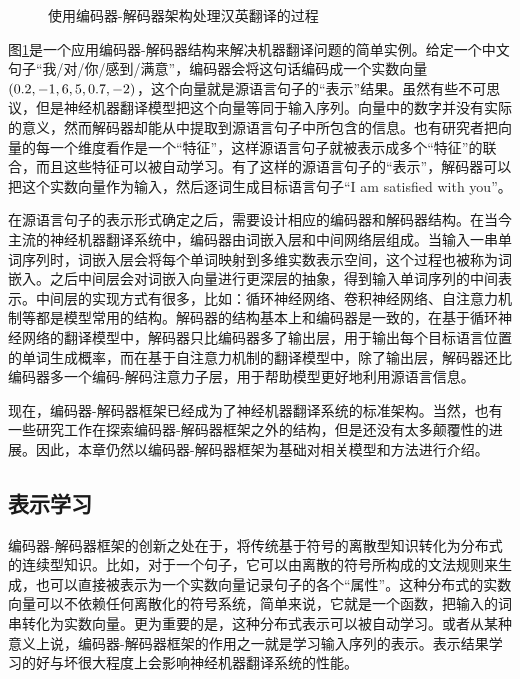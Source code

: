 \begin{figure}[htp]
\centering

\caption{使用编码器-解码器架构处理汉英翻译的过程 }
\label{fig:10-5}
\end{figure}

\parinterval  图\ref{fig:10-5}是一个应用编码器-解码器结构来解决机器翻译问题的简单实例。给定一个中文句子“我/对/你/感到/满意”，编码器会将这句话编码成一个实数向量$(0.2, -1, 6, \\ 5, 0.7, -2)$，这个向量就是源语言句子的“表示”结果。虽然有些不可思议，但是神经机器翻译模型把这个向量等同于输入序列。向量中的数字并没有实际的意义，然而解码器却能从中提取到源语言句子中所包含的信息。也有研究者把向量的每一个维度看作是一个“特征”，这样源语言句子就被表示成多个“特征”的联合，而且这些特征可以被自动学习。有了这样的源语言句子的“表示”，解码器可以把这个实数向量作为输入，然后逐词生成目标语言句子“I am satisfied with you”。

\parinterval  在源语言句子的表示形式确定之后，需要设计相应的编码器和解码器结构。在当今主流的神经机器翻译系统中，编码器由词嵌入层和中间网络层组成。当输入一串单词序列时，词嵌入层会将每个单词映射到多维实数表示空间，这个过程也被称为词嵌入。之后中间层会对词嵌入向量进行更深层的抽象，得到输入单词序列的中间表示。中间层的实现方式有很多，比如：循环神经网络、卷积神经网络、自注意力机制等都是模型常用的结构。解码器的结构基本上和编码器是一致的，在基于循环神经网络的翻译模型中，解码器只比编码器多了输出层，用于输出每个目标语言位置的单词生成概率，而在基于自注意力机制的翻译模型中，除了输出层，解码器还比编码器多一个编码-解码注意力子层，用于帮助模型更好地利用源语言信息。

\parinterval  现在，编码器-解码器框架已经成为了神经机器翻译系统的标准架构。当然，也有一些研究工作在探索编码器-解码器框架之外的结构，但是还没有太多颠覆性的进展。因此，本章仍然以编码器-解码器框架为基础对相关模型和方法进行介绍。

\subsection{表示学习}

\parinterval 编码器-解码器框架的创新之处在于，将传统基于符号的离散型知识转化为分布式的连续型知识。比如，对于一个句子，它可以由离散的符号所构成的文法规则来生成，也可以直接被表示为一个实数向量记录句子的各个“属性”。这种分布式的实数向量可以不依赖任何离散化的符号系统，简单来说，它就是一个函数，把输入的词串转化为实数向量。更为重要的是，这种分布式表示可以被自动学习。或者从某种意义上说，编码器-解码器框架的作用之一就是学习输入序列的表示。表示结果学习的好与坏很大程度上会影响神经机器翻译系统的性能。


